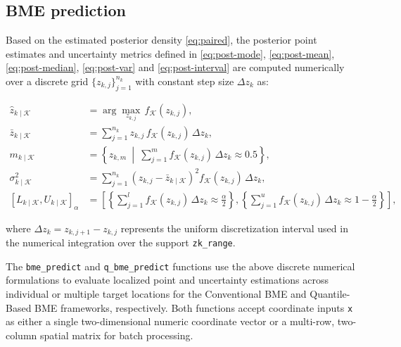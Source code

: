 \subsection{BME prediction}\label{bme-prediction}

Based on the estimated posterior density \eqref{eq:paired}, the posterior point estimates and uncertainty metrics defined in \eqref{eq:post-mode}, \eqref{eq:post-mean}, \eqref{eq:post-median}, \eqref{eq:post-var} and \eqref{eq:post-interval} are computed numerically over a discrete grid \(\{z_{k,j}\}_{j=1}^{n_k}\) with constant step size \(\Delta z_k\) as:

\vspace{-1em}

\begin{align}
\hat{z}_{k \mid \mathcal{K}} &= \arg\max_{z_{k,j}} \, f_{\mathcal{K}}(z_{k,j}), \label{eq:num-post-mode} \\
\bar{z}_{k \mid \mathcal{K}} &= \sum_{j=1}^{n_k} z_{k,j} \, f_{\mathcal{K}}(z_{k,j}) \, \Delta z_k, \label{eq:num-post-mean} \\
m_{k \mid \mathcal{K}} &= \left\{ z_{k,m} \ \middle| \ \sum_{j=1}^{m} f_{\mathcal{K}}(z_{k,j}) \, \Delta z_k \approx 0.5 \right\}, \label{eq:num-post-median} \\
\sigma^2_{k \mid \mathcal{K}} &= \sum_{j=1}^{n_k} \left( z_{k,j} - \bar{z}_{k \mid \mathcal{K}} \right)^2 f_{\mathcal{K}}(z_{k,j}) \, \Delta z_k, \label{eq:num-post-var} \\
\left[L_{k \mid \mathcal{K}} , U_{k \mid \mathcal{K}}\right]_{\alpha} &=
\left[
\left\{\sum_{j=1}^{l} f_{\mathcal{K}}(z_{k,j}) \, \Delta z_k \approx \frac{\alpha}{2} \right\} ,
\left\{\sum_{j=1}^{u} f_{\mathcal{K}}(z_{k,j}) \, \Delta z_k \approx 1 - \frac{\alpha}{2} \right\}
\right]\label{eq:num-post-interval},
\end{align}

where \(\Delta z_k = z_{k, j+1} - z_{k, j}\) represents the uniform discretization interval used in the numerical integration over the support \texttt{zk\_range}.

The \texttt{bme\_predict} and \texttt{q\_bme\_predict} functions use the above discrete numerical formulations to evaluate localized point and uncertainty estimations across individual or multiple target locations for the Conventional BME and Quantile-Based BME frameworks, respectively. Both functions accept coordinate inputs \texttt{x} as either a single two-dimensional numeric coordinate vector or a multi-row, two-column spatial matrix for batch processing.

